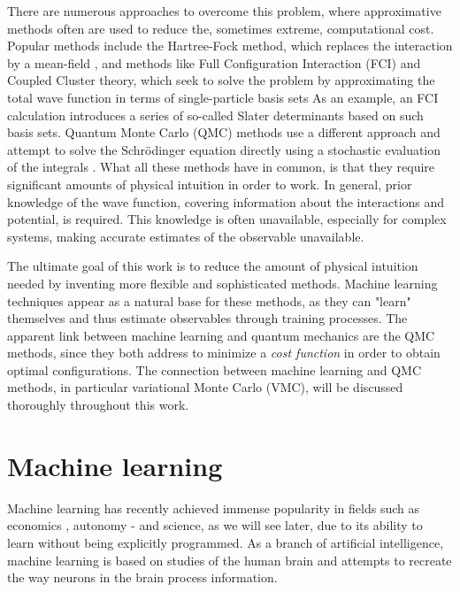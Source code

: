 There are numerous approaches to overcome this problem, where approximative methods often are used to reduce the, sometimes extreme, computational cost. Popular methods include the Hartree-Fock method, which replaces the interaction by a mean-field \supercite{hartree_wave_1928, fock_selfconsistent_1930}, and methods like Full Configuration Interaction (FCI) and Coupled Cluster theory, which seek to solve the problem by approximating the total wave function in terms of single-particle basis sets \supercite{daniel_crawford_introduction_2007} As an example, an FCI calculation introduces a series of so-called Slater determinants based on such basis sets. Quantum Monte Carlo (QMC) methods use a different approach and attempt to solve the Schrödinger equation directly using a stochastic evaluation of the integrals \supercite{bajdich_electronic_2010}. What all these methods have in common, is that they require significant amounts of physical intuition in order to work. In general, prior knowledge of the wave function, covering information about the interactions and potential, is required. This knowledge is often unavailable, especially for complex systems, making accurate estimates of the observable unavailable. 

The ultimate goal of this work is to reduce the amount of physical intuition needed by inventing more flexible and sophisticated methods. Machine learning techniques appear as a natural base for these methods, as they can "learn" themselves and thus estimate observables through training processes. The apparent link between machine learning and quantum mechanics are the QMC methods, since they both address to minimize a \textit{cost function} in order to obtain optimal configurations. The connection between machine learning and QMC methods, in particular variational Monte Carlo (VMC), will be discussed thoroughly throughout this work.

\section{Machine learning} \label{sec:machinelearning}
Machine learning has recently achieved immense popularity in fields such as economics \supercite{dube_scalable_2017}, autonomy \supercite{chernova_interactive_2009} - and science, as we will see later, due to its ability to learn without being explicitly programmed. As a branch of artificial intelligence, machine learning is based on studies of the human brain and attempts to recreate the way neurons in the brain process information.

